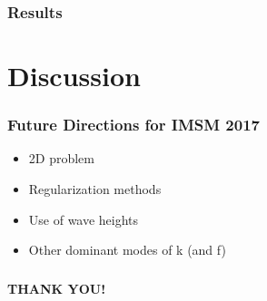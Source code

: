 \documentclass[7pt]{beamer}
\begin{document}



 \begin{frame}
\frametitle{Results}


\end{frame}





\section{Discussion}
\begin{frame}
 \frametitle{Future Directions for IMSM 2017}
 \begin{itemize}
 \item 2D problem
 \item Regularization methods
 \item Use of wave heights
 \item Other dominant modes of k (and f)
 \end{itemize}

\end{frame}
\begin{frame}
\frametitle{}
\hspace{2.5cm}
\begin{minipage}{50mm}   
                                                                                                                           
      \begin{alertblock}{}    
                                          
            \begin{center}
                                                                                                                                                                                  
                  \textbf{THANK YOU!}
                            
                                                                       
            \end{center}
      \end{alertblock}
\end{minipage}
\end{frame}
\end{document}
